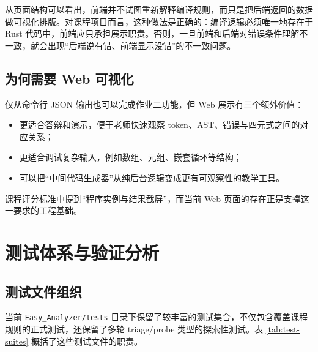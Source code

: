 \documentclass[UTF8,a4paper,12pt]{ctexart}
\newcommand{\pkg}[1]{\texttt{#1}}
\begin{document}
从页面结构可以看出，前端并不试图重新解释编译规则，而只是把后端返回的数据做可视化排版。对课程项目而言，这种做法是正确的：编译逻辑必须唯一地存在于 Rust 代码中，前端应只承担展示职责。否则，一旦前端和后端对错误条件理解不一致，就会出现“后端说有错、前端显示没错”的不一致问题。

\subsection{为何需要 Web 可视化}

仅从命令行 JSON 输出也可以完成作业二功能，但 Web 展示有三个额外价值：

\begin{itemize}
    \item 更适合答辩和演示，便于老师快速观察 token、AST、错误与四元式之间的对应关系；
    \item 更适合调试复杂输入，例如数组、元组、嵌套循环等结构；
    \item 可以把“中间代码生成器”从纯后台逻辑变成更有可观察性的教学工具。
\end{itemize}

课程评分标准中提到“程序实例与结果截屏”，而当前 Web 页面的存在正是支撑这一要求的工程基础。

\section{测试体系与验证分析}

\subsection{测试文件组织}

当前 \pkg{Easy\_Analyzer/tests} 目录下保留了较丰富的测试集合，不仅包含覆盖课程规则的正式测试，还保留了多轮 triage/probe 类型的探索性测试。表 \ref{tab:test-suites} 概括了这些测试文件的职责。
\end{document}

